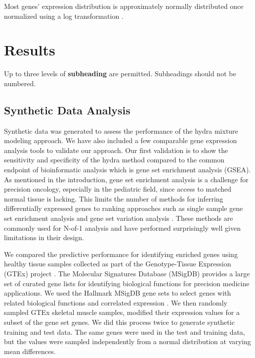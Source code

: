 \documentclass[fleqn,10pt]{wlscirep}
\begin{document}
Most genes' expression distribution is approximately normally distributed once normalized using a log transformation \cite{zwiener2014transforming}. 


\section*{Results}

Up to three levels of \textbf{subheading} are permitted. Subheadings should not be numbered.

\subsection*{Synthetic Data Analysis}
Synthetic data was generated to assess the performance of the hydra mixture modeling approach. We have also included a few comparable gene expression analysis tools to validate our approach. Our first validation is to show the sensitivity and specificity of the hydra method compared to the common endpoint of bioinformatic analysis which is gene set enrichment analysis (GSEA). As mentioned in the introduction, gene set enrichment analysis is a challenge for precision oncology, especially in the pediatric field, since access to matched normal tissue is lacking. This limits the number of methods for inferring differentially expressed genes to ranking approaches such as single sample gene set enrichment analysis \cite{barbie2009systematic} and gene set variation analysis \cite{hanzelmann2013gsva}. These methods are commonly used for N-of-1 analysis and have performed surprisingly well given limitations in their design.

We compared the predictive performance for identifying enriched genes using healthy tissue samples collected as part of the Genotype-Tissue Expression (GTEx) project \cite{lonsdale2013genotype}. The Molecular Signatures Database (MSigDB) provides a large set of curated gene lists for identifying biological functions for precision medicine applications. We used the Hallmark MSigDB gene sets to select genes with related biological functions and correlated expression \cite{liberzon2015molecular}. We then randomly sampled GTEx skeletal muscle samples, modified their expression values for a subset of the gene set genes. We did this process twice to generate synthetic training and test data. The same genes were used in the test and training data, but the values were sampled independently from a normal distribution at varying mean differences. 
\end{document}
